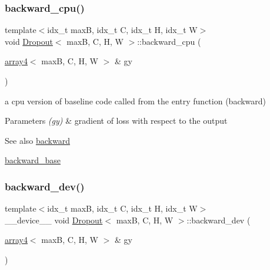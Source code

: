 \subsubsection{\texorpdfstring{backward\+\_\+cpu()}{backward\_cpu()}}
{\footnotesize\ttfamily template$<$idx\+\_\+t maxB, idx\+\_\+t C, idx\+\_\+t H, idx\+\_\+t W$>$ \\
void \hyperlink{structDropout}{Dropout}$<$ maxB, C, H, W $>$\+::backward\+\_\+cpu (\begin{DoxyParamCaption}\item[{\hyperlink{structarray4}{array4}$<$ maxB, C, H, W $>$ \&}]{gy }\end{DoxyParamCaption})\hspace{0.3cm}{\ttfamily [inline]}}



a cpu version of baseline code called from the entry function (backward) 


\begin{DoxyParams}{Parameters}
{\em (gy)} & gradient of loss with respect to the output \\
\hline
\end{DoxyParams}
\begin{DoxySeeAlso}{See also}
\hyperlink{structDropout_afe1afe7ce80e59d1b48c820a724aae1b}{backward} 

\hyperlink{structDropout_a8ea26e89ddc6b5e4546f5a6ed019ad9a}{backward\+\_\+base} 
\end{DoxySeeAlso}
\mbox{\label{structDropout_a5bbc54ad4125bf6768b5eeb17802a468}} 
\subsubsection{\texorpdfstring{backward\+\_\+dev()}{backward\_dev()}}
{\footnotesize\ttfamily template$<$idx\+\_\+t maxB, idx\+\_\+t C, idx\+\_\+t H, idx\+\_\+t W$>$ \\
\+\_\+\+\_\+device\+\_\+\+\_\+ void \hyperlink{structDropout}{Dropout}$<$ maxB, C, H, W $>$\+::backward\+\_\+dev (\begin{DoxyParamCaption}\item[{\hyperlink{structarray4}{array4}$<$ maxB, C, H, W $>$ \&}]{gy }\end{DoxyParamCaption})\hspace{0.3cm}{\ttfamily [inline]}}



